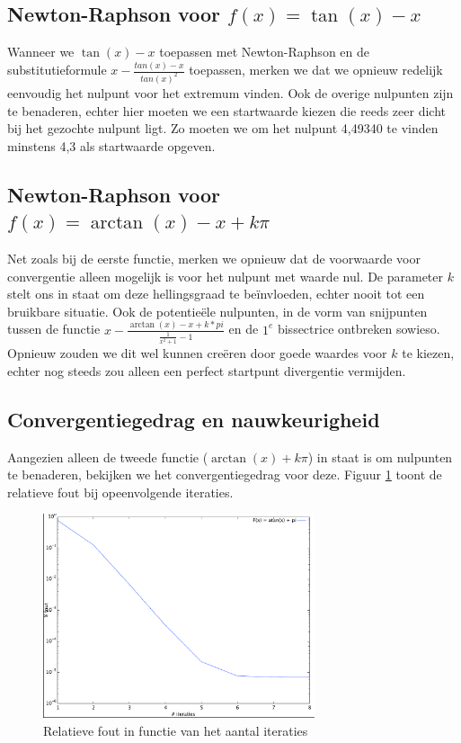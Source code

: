 \documentclass[12pt,a4paper]{article}
\begin{document}
\subsection{Newton-Raphson voor $f(x) = \tan(x) - x$}

Wanneer we $\tan(x) - x$ toepassen met Newton-Raphson en de substitutieformule $x - \frac{tan(x) - x}{tan(x)^2}$ toepassen, merken we dat we opnieuw redelijk eenvoudig het nulpunt voor het extremum vinden. Ook de overige nulpunten zijn te benaderen, echter hier moeten we een startwaarde kiezen die reeds zeer dicht bij het gezochte nulpunt ligt. Zo moeten we om het nulpunt 4,49340 te vinden minstens 4,3 als startwaarde opgeven.

\subsection{Newton-Raphson voor $f(x) = \arctan(x) - x + k\pi$}

Net zoals bij de eerste functie, merken we opnieuw dat de voorwaarde voor convergentie alleen mogelijk is voor het nulpunt met waarde nul. De parameter $k$ stelt ons in staat om deze hellingsgraad te be\"invloeden, echter nooit tot een bruikbare situatie. Ook de potentie\"ele nulpunten, in de vorm van snijpunten tussen de functie $x - \frac{\arctan(x) - x + k*pi}{\frac{1}{x^2+1} - 1}$ en de $1^e$ bissectrice ontbreken sowieso. Opnieuw zouden we dit wel kunnen cre\"eren door goede waardes voor $k$ te kiezen, echter nog steeds zou alleen een perfect startpunt divergentie vermijden.

\subsection{Convergentiegedrag en nauwkeurigheid}

Aangezien alleen de tweede functie ($\arctan(x) + k\pi$) in staat is om nulpunten te benaderen, bekijken we het convergentiegedrag voor deze. Figuur \ref{fig:convergentie-error} toont de relatieve fout bij opeenvolgende iteraties.

\begin{figure}
\begin{center}
 \includegraphics[width=80mm]{resources/convergentie-error.pdf}
 \caption{Relatieve fout in functie van het aantal iteraties}
  \label{fig:convergentie-error}
\end{center}
\end{figure}
\end{document}
